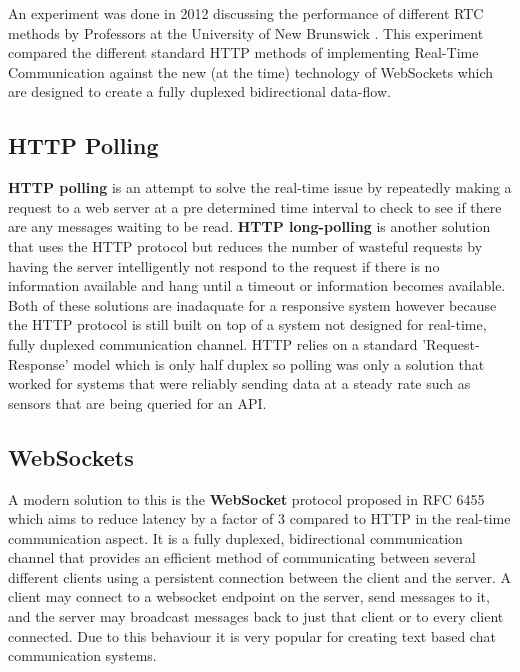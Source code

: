 An experiment was done in 2012 discussing the performance of different RTC methods by Professors at the University of New Brunswick \cite{websocket}. This experiment compared the different standard HTTP methods of implementing Real-Time Communication against the new (at the time) technology of WebSockets which are designed to create a fully duplexed bidirectional data-flow.

\subsection{HTTP Polling}

\textbf{HTTP polling} is an attempt to solve the real-time issue by repeatedly making a request to a web server at a pre determined time interval to check to see if there are any messages waiting to be read.  \textbf{HTTP long-polling} is another solution that uses the HTTP protocol but reduces the number of wasteful requests by having the server intelligently not respond to the request if there is no information available and hang until a timeout or information becomes available. Both of these solutions are inadaquate for a responsive system however because the HTTP protocol is still built on top of a system not designed for real-time, fully duplexed communication channel. HTTP relies on a standard 'Request-Response' model which is only half duplex so polling was only a solution that worked for systems that were reliably sending data at a steady rate such as sensors that are being queried for an API.

\subsection{WebSockets}

A modern solution to this is the \textbf{WebSocket} protocol proposed in RFC 6455 \cite{wsrfc} which aims to reduce latency by a factor of 3 compared to HTTP in the real-time communication aspect. It is a fully duplexed, bidirectional communication channel that provides an efficient method of communicating between several different clients using a persistent connection between the client and the server. A client may connect to a websocket endpoint on the server, send messages to it, and the server may broadcast messages back to just that client or to every client connected. Due to this behaviour it is very popular for creating text based chat communication systems.


